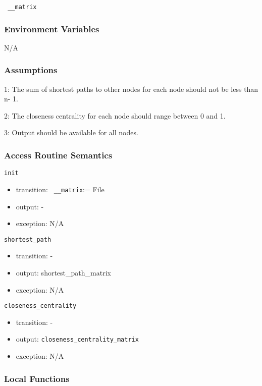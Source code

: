 \documentclass[12pt, titlepage]{article}
\begin{document}
\texttt{ \_\_matrix}

\subsubsection{Environment Variables}

N/A

\subsubsection{Assumptions}

\begin{description}
\item 1: The sum of shortest paths to other nodes for each node should not be less than n- 1.
\item 2: The closeness centrality for each node should range between 0 and 1.
\item 3: Output should be available for all nodes.
\end{description}

\subsubsection{Access Routine Semantics}

\noindent \texttt{init}
\begin{itemize}
\item transition: \texttt{ \_\_matrix}:= File 
\item output: -
\item exception: N/A  
\end{itemize}

\noindent \texttt{shortest\_path}
\begin{itemize}
\item transition: - 
\item output: {shortest\_path\_matrix}
\item exception: N/A  
\end{itemize}

\noindent \texttt{closeness\_centrality}
\begin{itemize}
\item transition: - 
\item output: \texttt{closeness\_centrality\_matrix}
\item exception: N/A  
\end{itemize}

\subsubsection{Local Functions}
\end{document}
